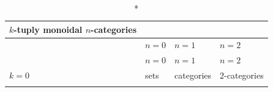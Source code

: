 \documentclass{article}
\begin{document}
\newpage
\begin{longtable}[]{@{}llll@{}}
\caption*{\(k\)-tuply monoidal \(n\)-categories}\tabularnewline
\toprule
\begin{minipage}[b]{0.26\columnwidth}\raggedright
\strut
\end{minipage} & \begin{minipage}[b]{0.21\columnwidth}\raggedright
\(n=0\)\strut
\end{minipage} & \begin{minipage}[b]{0.21\columnwidth}\raggedright
\(n=1\)\strut
\end{minipage} & \begin{minipage}[b]{0.21\columnwidth}\raggedright
\(n=2\)\strut
\end{minipage}\tabularnewline
\midrule
\endfirsthead
\toprule
\begin{minipage}[b]{0.26\columnwidth}\raggedright
\strut
\end{minipage} & \begin{minipage}[b]{0.21\columnwidth}\raggedright
\(n=0\)\strut
\end{minipage} & \begin{minipage}[b]{0.21\columnwidth}\raggedright
\(n=1\)\strut
\end{minipage} & \begin{minipage}[b]{0.21\columnwidth}\raggedright
\(n=2\)\strut
\end{minipage}\tabularnewline
\midrule
\endhead
\begin{minipage}[t]{0.26\columnwidth}\raggedright
\(k=0\)\strut
\end{minipage} & \begin{minipage}[t]{0.21\columnwidth}\raggedright
sets\strut
\end{minipage} & \begin{minipage}[t]{0.21\columnwidth}\raggedright
categories\strut
\end{minipage} & \begin{minipage}[t]{0.21\columnwidth}\raggedright
\(2\)-categories\strut
\end{minipage}\tabularnewline
\begin{minipage}[t]{0.26\columnwidth}\raggedright
\strut
\end{minipage} & \begin{minipage}[t]{0.21\columnwidth}\raggedright
\strut
\end{minipage} & \begin{minipage}[t]{0.21\columnwidth}\raggedright
\strut
\end{minipage} & \begin{minipage}[t]{0.21\columnwidth}\raggedright

\end{minipage}
\end{longtable}
\end{document}
